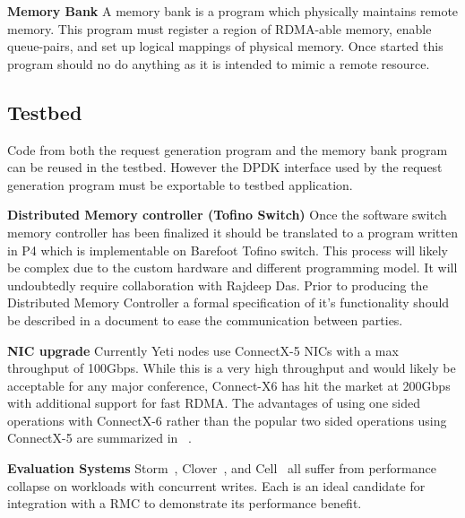 \textbf{Memory Bank} A memory bank is a program which physically
maintains remote memory. This program must register a region of
RDMA-able memory, enable queue-pairs, and set up logical mappings of
physical memory. Once started this program should no do anything as it
is intended to mimic a remote resource.

\subsection{Testbed}
Code from both the request generation program and the memory bank
program can be reused in the testbed. However the DPDK interface used
by the request generation program must be exportable to testbed
application.

\textbf{Distributed Memory controller (Tofino Switch)}
Once the software switch memory controller has been finalized it
should be translated to a program written in P4 which is
implementable on Barefoot Tofino switch. This process will likely be
complex due to the custom hardware and different programming model. It
will undoubtedly require collaboration with Rajdeep Das. Prior to
producing the Distributed Memory Controller a formal specification of
it's functionality should be described in a document to ease the
communication between parties.

\textbf{NIC upgrade} Currently Yeti nodes use ConnectX-5 NICs with a
max throughput of 100Gbps. While this is a very high throughput and
would likely be acceptable for any major conference, Connect-X6 has
hit the market at 200Gbps with additional support for fast RDMA. The
advantages of using one sided operations with ConnectX-6 rather than
the popular two sided operations using ConnectX-5 are summarized in
~\cite{storm}.

\textbf{Evaluation Systems}
Storm~\cite{storm}, Clover~\cite{clover}, and Cell~\cite{cell} all
suffer from performance collapse  on workloads with concurrent writes.
Each is an ideal candidate for integration with a RMC to demonstrate
its performance benefit.

\pagebreak


